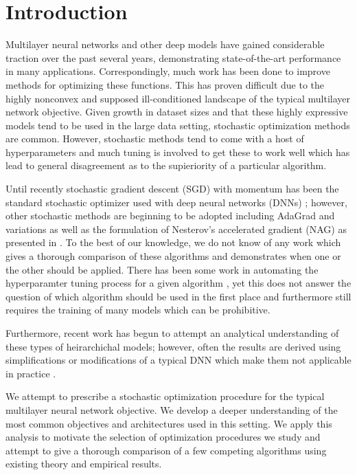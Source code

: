 \section{Introduction}

Multilayer neural networks and other deep models have gained considerable
traction over the past several years, demonstrating state-of-the-art
performance in many applications. Correspondingly, much work has been done to
improve methods for optimizing these functions. This has proven difficult due
to the highly nonconvex and supposed ill-conditioned landscape of the typical
multilayer network objective. Given growth in dataset sizes and that these
highly expressive models tend to be used in the large data setting, stochastic
optimization methods are common. However, stochastic methods tend to come with
a host of hyperparameters and much tuning is involved to get these to work well
which has lead to general disagreement as to the supieriority of a particular
algorithm. 

Until recently stochastic gradient descent (SGD) with momentum has been the
standard stochastic optimizer used with deep neural networks (DNNs)
\cite{hinton_2010}; however, other stochastic methods are beginning to be
adopted including AdaGrad \cite{duchi_2011} and variations as well as the
formulation of Nesterov's accelerated gradient (NAG) as presented in
\cite{sutskever_2013}. To the best of our knowledge, we do not know of any work
which gives a thorough comparison of these algorithms and demonstrates when one
or the other should be applied. There has been some work in automating the
hyperparamter tuning process for a given algorithm \cite{snoek_2012}, yet this
does not answer the question of which algorithm should be used in the first
place and furthermore still requires the training of many models which can be
prohibitive. 

Furthermore, recent work has begun to attempt an analytical understanding of
these types of heirarchichal models; however, often the results are derived
using simplifications or modifications of a typical DNN which make them not
applicable in practice \cite{saxe_2013}. 

We attempt to prescribe a stochastic optimization procedure for the typical
multilayer neural network objective. We develop a deeper understanding of the
most common objectives and architectures used in this setting. We apply this
analysis to motivate the selection of optimization procedures we study and
attempt to give a thorough comparison of a few competing algorithms using
existing theory and empirical results. 

